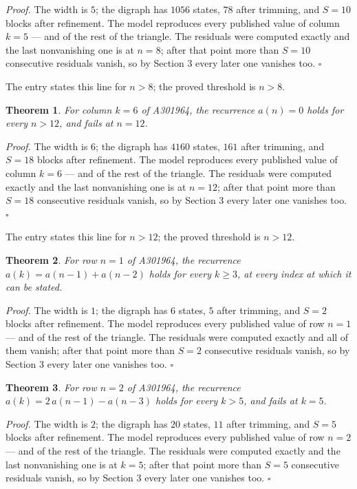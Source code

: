 \documentclass[11pt]{article}
\newtheorem{theorem}{Theorem}
\theoremstyle{definition}
\begin{document}
{\itshape Proof.} The width is $5$; the digraph has $1056$ states, $78$ after trimming, and $S = 10$ blocks after refinement. The model reproduces every published value of column $k = 5$ --- and of the rest of the triangle. The residuals were computed exactly and the last nonvanishing one is at $n = 8$; after that point more than $S = 10$ consecutive residuals vanish, so by Section 3 every later one vanishes too. $\square$

The entry states this line for $n > 8$; the proved threshold is $n > 8$.

\begin{theorem} For column $k = 6$ of A301964, the recurrence $a(n) = 0$ holds for every $n > 12$, and fails at $n = 12$.\end{theorem}

{\itshape Proof.} The width is $6$; the digraph has $4160$ states, $161$ after trimming, and $S = 18$ blocks after refinement. The model reproduces every published value of column $k = 6$ --- and of the rest of the triangle. The residuals were computed exactly and the last nonvanishing one is at $n = 12$; after that point more than $S = 18$ consecutive residuals vanish, so by Section 3 every later one vanishes too. $\square$

The entry states this line for $n > 12$; the proved threshold is $n > 12$.

\begin{theorem} For row $n = 1$ of A301964, the recurrence $a(k) = a(n-1) + a(n-2)$ holds for every $k \ge 3$, at every index at which it can be stated.\end{theorem}

{\itshape Proof.} The width is $1$; the digraph has $6$ states, $5$ after trimming, and $S = 2$ blocks after refinement. The model reproduces every published value of row $n = 1$ --- and of the rest of the triangle. The residuals were computed exactly and all of them vanish; after that point more than $S = 2$ consecutive residuals vanish, so by Section 3 every later one vanishes too. $\square$

\begin{theorem} For row $n = 2$ of A301964, the recurrence $a(k) = 2\,a(n-1) - a(n-3)$ holds for every $k > 5$, and fails at $k = 5$.\end{theorem}

{\itshape Proof.} The width is $2$; the digraph has $20$ states, $11$ after trimming, and $S = 5$ blocks after refinement. The model reproduces every published value of row $n = 2$ --- and of the rest of the triangle. The residuals were computed exactly and the last nonvanishing one is at $k = 5$; after that point more than $S = 5$ consecutive residuals vanish, so by Section 3 every later one vanishes too. $\square$
\end{document}
